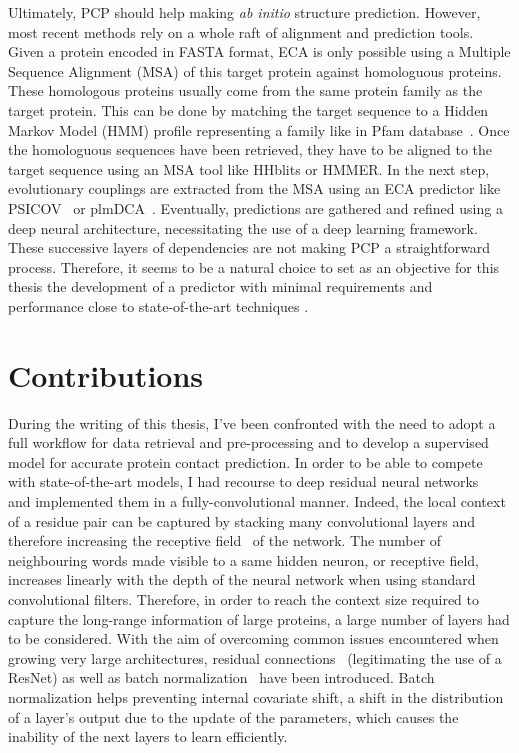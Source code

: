     Ultimately, PCP should help making \textit{ab initio} structure prediction.
    However, most recent methods rely on a whole raft of alignment and prediction tools.
    Given a protein encoded in FASTA format, ECA is only possible using a Multiple Sequence Alignment (MSA)
    of this target protein against homologuous proteins.
    These homologous proteins usually come from the same protein family
    as the target protein.
    This can be done by matching the target sequence to a Hidden Markov Model (HMM) profile representing a family
    like in Pfam database~\cite{Pfam}. Once the homologuous sequences have been retrieved, they have to be aligned to
    the target sequence using an MSA tool like HHblits or HMMER. In the next step, evolutionary couplings are extracted from
    the MSA using an ECA predictor like PSICOV~\cite{doi:10.1093/bioinformatics/btr638} or plmDCA~\cite{EKEBERG2014341}.
    Eventually, predictions are gathered and refined using a deep neural architecture, necessitating the use
    of a deep learning framework. These successive layers of dependencies are not making PCP a straightforward process.
    Therefore, it seems to be a natural choice to set as an objective for this thesis the development of a predictor with
    minimal requirements and performance close to state-of-the-art techniques
    \cite{RaptorX, DeepContact, doi:10.1093/bioinformatics/bty341, Michel383133, DeepMind}.

\section{Contributions}

    During the writing of this thesis, I've been confronted with the need to
    adopt a full workflow for data retrieval and pre-processing and to develop a supervised
    model for accurate protein contact prediction. In order to be able to compete
    with state-of-the-art models, I had recourse to deep residual
    neural networks~\cite{DBLP:journals/corr/HeZRS15} and implemented them in a
    fully-convolutional manner.
    Indeed, the local context of a residue pair can be captured by stacking many
    convolutional layers and therefore increasing the receptive field~\cite{Hubel1962}
    of the network. The number of neighbouring words made visible to a same hidden neuron,
    or receptive field, increases linearly with the depth
    of the neural network when using standard convolutional filters.
    Therefore, in order to reach the context size required to capture the long-range information
    of large proteins, a large number of layers had to be considered.
    With the aim of overcoming common issues
    encountered when growing very large architectures,
    residual connections~\cite{DBLP:journals/corr/HeZRS15}
    (legitimating the use of a ResNet) as well as batch
    normalization~\cite{DBLP:journals/corr/IoffeS15} have been introduced.
    Batch normalization helps preventing internal covariate shift,
    a shift in the distribution of a layer's output due to the update of the parameters,
    which causes the inability of the next layers to learn efficiently.

